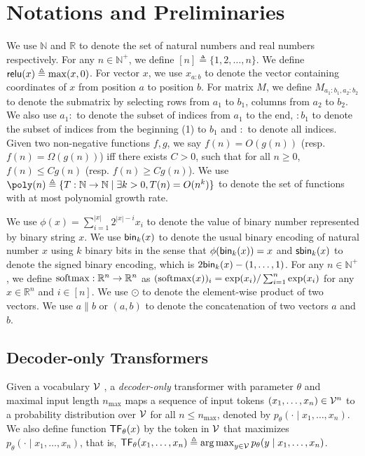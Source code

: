 

 
\section{Notations and Preliminaries}\label{sec:prelim}

 We use $\mathbb{N}$ and $\mathbb{R}$ to denote the set of natural numbers and real numbers respectively. For any $n\in\mathbb{N}^+$, we define $[n]\triangleq \{1,2,\ldots,n\}$.  We define $\mathsf{relu}(x)\triangleq \max(x,0)$. For vector $x$, we use $x_{a:b}$ to denote the vector containing coordinates of $x$ from position $a$ to position $b$. For matrix $M$, we define $M_{a_1:b_1,a_2:b_2}$ to denote the submatrix by selecting rows from $a_1$ to $b_1$, columns from $a_2$ to $b_2$. We also use $a_1:$ to denote the subset of indices from $a_1$ to the end, $:b_1$ to denote the subset of indices from the beginning (1) to $b_1$ and $:$ to denote all indices.
 Given two non-negative functions $f,g$, we say $f(n)= O(g(n))$ (resp. $f(n)= \Omega(g(n))$) iff there exists $C>0$, such that for all $n\ge 0$, $f(n)\le Cg(n)$ (resp. $f(n) \ge Cg(n)$).  We use $\poly(n)\triangleq \{T:\mathbb{N}\to\mathbb{N}\mid \exists k>0, T(n)= O(n^k)\}$ to denote the set of functions with at most polynomial growth rate.
 
 We use $\phi(x) = \sum_{i=1}^{|x|} 2^{|x|-i}x_i$ to denote the value of binary number represented by binary string $x$.
 We use $\mathsf{bin}_k(x)$ to denote the usual binary encoding of natural number $x$ using $k$ binary bits in the sense that $\phi(\mathsf{bin}_k(x)) = x$ and $\mathsf{sbin}_k(x)$ to denote the signed binary encoding, which is $2\mathsf{bin}_k(x)-(1,\ldots,1)$. For any $n\in\mathbb{N}^+$, we define $\mathrm{softmax}:\mathbb{R}^n\to\mathbb{R}^n$ as $(\mathrm{softmax}(x))_i = \exp(x_i)/\sum_{i=1}^n \exp(x_i)$ for any $x\in\mathbb{R}^n$ and $i\in [n]$. We use $\odot$ to denote the element-wise product of two vectors. We use $a\|b$ or $(a,b)$ to denote the concatenation of two vectors $a$ and $b$. 

\subsection{Decoder-only Transformers}
Given a vocabulary ${\mathcal{V}}$ , a \emph{decoder-only} transformer with parameter $\theta$ and maximal input length $n_{\max}$ maps a sequence of input tokens $(x_1,\ldots,x_n)\in{\mathcal{V}}^n$ to a probability distribution over $ {\mathcal{V}}$ for all $n\le n_{\max}$, denoted by $p_\theta(\cdot\mid x_1,\ldots, x_n)$. We also define function $\mathsf{TF}_\theta(x)$ by the token in ${\mathcal{V}}$ that maximizes $p_\theta(\cdot\mid x_1,\ldots, x_n)$, that is, $\mathsf{TF}_\theta(x_1,\ldots,x_n)\triangleq \operatorname*{arg\,max}_{y\in{\mathcal{V}}} p_\theta(y\mid x_1,\ldots, x_n)$.


